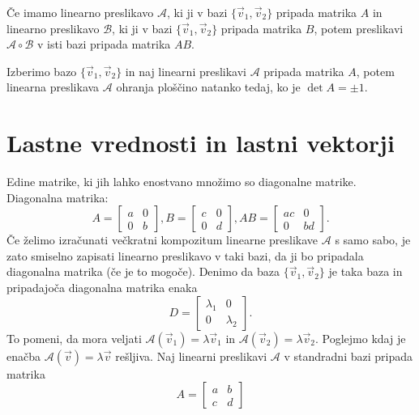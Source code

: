 \documentclass[GmVic, tisk]{gv}
\begin{document}
\begin{trditev}Če imamo linearno preslikavo $\mathcal A$, ki ji v bazi $\{\vec v_1,\vec v_2\}$ pripada matrika $A$ in linearno preslikavo $\mathcal B$, ki ji v bazi $\{\vec v_1,\vec v_2\}$ pripada matrika $B$, potem preslikavi  $\mathcal A \circ \mathcal B$ v isti bazi pripada matrika $AB$.
\end{trditev}

\begin{trditev} Izberimo bazo $\{\vec v_1,\vec v_2\}$ in naj linearni preslikavi $\mathcal A$ pripada matrika $A$, potem linearna preslikava $\mathcal A$ ohranja ploščino natanko tedaj, ko je $\det A = \pm 1$.
\end{trditev}

\section{Lastne vrednosti in lastni vektorji}
Edine matrike, ki jih lahko enostvano množimo so diagonalne matrike. Diagonalna matrika:
$$
  A=\begin{bmatrix}
         a&0\\
         0&b
      \end{bmatrix}, 
  B=\begin{bmatrix}
         c&0\\
         0&d
      \end{bmatrix}, 
AB=  \begin{bmatrix}
         ac&0\\
         0&bd
      \end{bmatrix}.
$$
Če želimo izračunati večkratni kompozitum linearne preslikave $\mathcal A$ s samo sabo, je zato smiselno zapisati linearno preslikavo v taki bazi, da ji bo pripadala diagonalna matrika (če je to mogoče). 	Denimo da baza $\{\vec v_1, \vec v_2\}$ je taka baza in pripadajoča diagonalna matrika enaka 
$$ D=
     \begin{bmatrix}
         \lambda_1&0\\
         0&\lambda_2
      \end{bmatrix}.
$$
To pomeni, da mora veljati $\mathcal A(\vec v_1)= \lambda \vec v_1$ in $\mathcal A(\vec v_2)= \lambda \vec v_2.$ Poglejmo kdaj je enačba $\mathcal A(\vec v) = \lambda \vec v$ rešljiva.
Naj linearni preslikavi $\mathcal A$ v standradni bazi pripada matrika
$$ A=\begin{bmatrix}
         a&b\\
         c&d
      \end{bmatrix}$$
\end{document}
